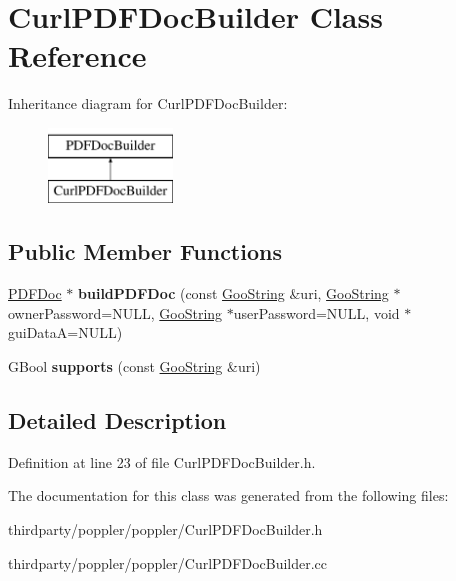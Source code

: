 \hypertarget{class_curl_p_d_f_doc_builder}{}\section{Curl\+P\+D\+F\+Doc\+Builder Class Reference}
\label{class_curl_p_d_f_doc_builder}
Inheritance diagram for Curl\+P\+D\+F\+Doc\+Builder\+:\begin{figure}[H]
\begin{center}
\leavevmode
\includegraphics[height=2.000000cm]{class_curl_p_d_f_doc_builder}
\end{center}
\end{figure}
\subsection*{Public Member Functions}
\begin{DoxyCompactItemize}
\item 
\mbox{\label{class_curl_p_d_f_doc_builder_a0a4a6db5c01cec672804299e44c769f3}} 
\hyperlink{class_p_d_f_doc}{P\+D\+F\+Doc} $\ast$ {\bfseries build\+P\+D\+F\+Doc} (const \hyperlink{class_goo_string}{Goo\+String} \&uri, \hyperlink{class_goo_string}{Goo\+String} $\ast$owner\+Password=N\+U\+LL, \hyperlink{class_goo_string}{Goo\+String} $\ast$user\+Password=N\+U\+LL, void $\ast$gui\+DataA=N\+U\+LL)
\item 
\mbox{\label{class_curl_p_d_f_doc_builder_a988a93b8fed2b000718dcefaad1c8d05}} 
G\+Bool {\bfseries supports} (const \hyperlink{class_goo_string}{Goo\+String} \&uri)
\end{DoxyCompactItemize}


\subsection{Detailed Description}


Definition at line 23 of file Curl\+P\+D\+F\+Doc\+Builder.\+h.



The documentation for this class was generated from the following files\+:\begin{DoxyCompactItemize}
\item 
thirdparty/poppler/poppler/Curl\+P\+D\+F\+Doc\+Builder.\+h\item 
thirdparty/poppler/poppler/Curl\+P\+D\+F\+Doc\+Builder.\+cc\end{DoxyCompactItemize}

